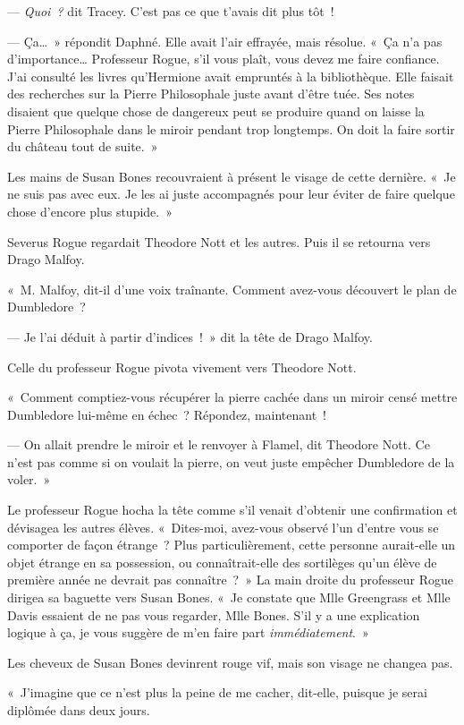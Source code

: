 --- \emph{Quoi~?} dit Tracey.
C'est pas ce que t'avais dit plus tôt~!

--- Ça…~» répondit Daphné.
Elle avait l'air effrayée, mais résolue.
«~Ça n'a pas d'importance…
Professeur Rogue, s'il vous plaît, vous devez me faire confiance.
J'ai consulté les livres qu'Hermione avait empruntés à la bibliothèque.
Elle faisait des recherches sur la Pierre Philosophale juste avant d'être tuée.
Ses notes disaient que quelque chose de dangereux peut se produire quand on laisse la Pierre Philosophale dans le miroir pendant trop longtemps.
On doit la faire sortir du château tout de suite.~»

Les mains de Susan Bones recouvraient à présent le visage de cette dernière.
«~Je ne suis pas avec eux.
Je les ai juste accompagnés pour leur éviter de faire quelque chose d'encore plus stupide.~»

Severus Rogue regardait Theodore Nott et les autres.
Puis il se retourna vers Drago Malfoy.

«~M. Malfoy, dit-il d'une voix traînante.
Comment avez-vous découvert le plan de Dumbledore~?

--- Je l'ai déduit à partir d'indices~!~»
dit la tête de Drago Malfoy.

Celle du professeur Rogue pivota vivement vers Theodore Nott.

«~Comment comptiez-vous récupérer la pierre cachée dans un miroir censé mettre Dumbledore lui-même en échec~?
Répondez, maintenant~!

--- On allait prendre le miroir et le renvoyer à Flamel, dit Theodore Nott.
Ce n'est pas comme si on voulait la pierre, on veut juste empêcher Dumbledore de la voler.~»

Le professeur Rogue hocha la tête comme s'il venait d'obtenir une confirmation et dévisagea les autres élèves.
«~Dites-moi, avez-vous observé l'un d'entre vous se comporter de façon étrange~?
Plus particulièrement, cette personne aurait-elle un objet étrange en sa possession, ou connaîtrait-elle des sortilèges qu'un élève de première année ne devrait pas connaître~?~»
La main droite du professeur Rogue dirigea sa baguette vers Susan Bones.
«~Je constate que Mlle Greengrass et Mlle Davis essaient de ne pas vous regarder, Mlle Bones.
S'il y a une explication logique à ça, je vous suggère de m'en faire part \emph{immédiatement}.~»

Les cheveux de Susan Bones devinrent rouge vif, mais son visage ne changea pas.

«~J'imagine que ce n'est plus la peine de me cacher, dit-elle, puisque je serai diplômée dans deux jours.

